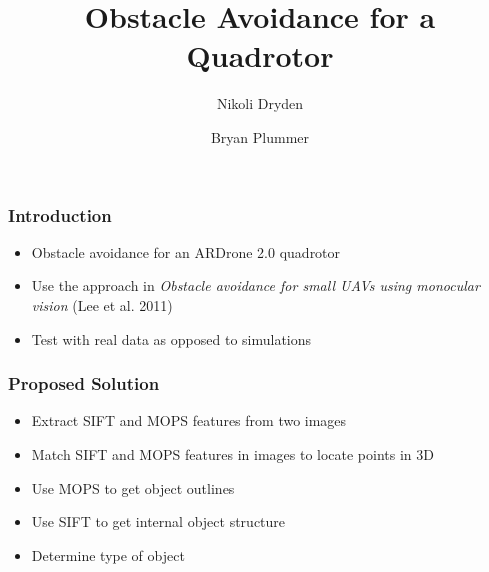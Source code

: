\documentclass[xcolor=x11names,compress,t]{beamer}
\renewcommand{\(}{\begin{columns}}
\renewcommand{\)}{\end{columns}}
\newcommand{\<}[1]{\begin{column}{#1}}
\renewcommand{\>}{\end{column}}
\begin{document}
\abovedisplayskip=6pt

%
%

\begin{frame}
\title{Obstacle Avoidance for a Quadrotor}
\author{Nikoli Dryden \and Bryan Plummer}
\date{}
\titlepage
\end{frame}


\begin{frame}
  \frametitle{Introduction}
  \begin{itemize}
  \item Obstacle avoidance for an ARDrone 2.0 quadrotor
  \item Use the approach in \emph{Obstacle avoidance for small UAVs using monocular vision} (Lee et al. 2011)
  \item Test with real data as opposed to simulations
  \end{itemize}
\end{frame}

\begin{frame}
  \frametitle{Proposed Solution}
  \begin{itemize}
  \item Extract SIFT and MOPS features from two images
  \item Match SIFT and MOPS features in images to locate points in 3D
  \item Use MOPS to get object outlines
  \item Use SIFT to get internal object structure
  \item Determine type of object
  \end{itemize}
\end{frame}
\end{document}
